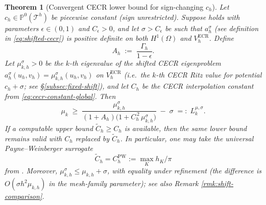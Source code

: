 \documentclass[11pt]{article}
\theoremstyle{plain}
\newtheorem{theorem}{Theorem}
\theoremstyle{definition}
\theoremstyle{remark}
\newcommand{\ECR}{\mathrm{ECR}}
\begin{document}
\begin{theorem}[Convergent CECR lower bound for sign-changing $c_h$]
\label{thm:cecr-lb-convergent}
Let $c_h\in\mathbb{P}^0(\mathcal{T}^h)$ be piecewise constant
(sign unrestricted).
Suppose  holds with parameters $\epsilon\in(0,1)$
and $C_\epsilon>0$, and let $\sigma>C_\epsilon$ be such that
$a_h^\sigma$ (see definition in \eqref{eq:shifted-cecr}) is positive definite on both $H^1(\Omega)$ and
$V_h^{\ECR}$. Define
\begin{equation}
\label{eq:A-constant}
  A_h \;:=\; \frac{\Gamma_h}{1-\epsilon}.
\end{equation}
Let $\mu_{k,h}^\sigma>0$ be the $k$-th eigenvalue of the shifted
CECR eigenproblem $a_h^\sigma(u_h,v_h)=\mu_{k,h}^\sigma(u_h,v_h)$
on $V_h^{\ECR}$ (i.e.\ the $k$-th CECR Ritz value for potential
$c_h+\sigma$; see \S\ref{subsec:fixed-shift}), and let
$C_h$ be the CECR interpolation constant from
\eqref{eq:cecr-constant-global}. Then
\begin{equation}
\label{eq:cecr-lb-convergent}
  \mu_k
  \;\ge\;
  \frac{\mu_{k,h}^\sigma}
       {(1+A_h)\bigl(1+C_h^{\,2}\,\mu_{k,h}^\sigma\bigr)}
  \;-\;\sigma
  \;=:\; L_k^{\mu,\sigma}.
\end{equation}
If a computable upper bound $\widetilde C_h\ge C_h$ is available, then
the same lower bound remains valid with $C_h$ replaced by
$\widetilde C_h$.  In particular, one may take the universal
Payne--Weinberger surrogate
\[
  \widetilde C_h=C_h^{\mathrm{PW}}:=\max_K h_K/\pi
\]
from .  Moreover,
$\mu_{k,h}^\sigma\le\mu_{k,h}+\sigma$, with equality under
refinement (the difference is $O(\sigma h^2\mu_{k,h})$ in the
mesh-family parameter); see also Remark \ref{rmk:shift-comparison}.
\end{theorem}
\end{document}
